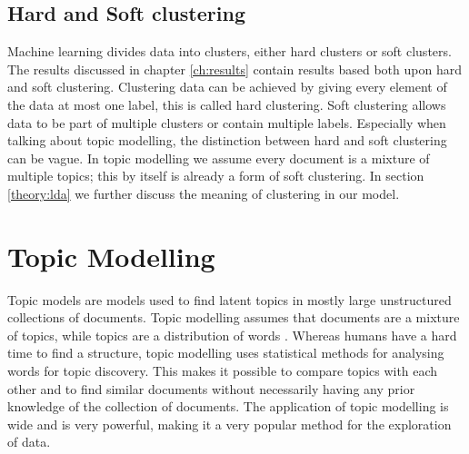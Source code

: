 \subsection{Hard and Soft clustering}
Machine learning divides data into clusters, either hard clusters or soft clusters. The results discussed in chapter \ref{ch:results} contain results based both upon hard and soft clustering. Clustering data can be achieved by giving every element of the data at most one label, this is called hard clustering. Soft clustering allows data to be part of multiple clusters or contain multiple labels. Especially when talking about topic modelling, the distinction between hard and soft clustering can be vague. In topic modelling we assume every document is a mixture of multiple topics; this by itself is already a form of soft clustering. In section \ref{theory:lda} we further discuss the meaning of clustering in our model.

\section{Topic Modelling}\label{theory:tm}
Topic models are models used to find latent topics in mostly large unstructured collections of documents. Topic modelling assumes that documents are a mixture of topics, while topics are a distribution of words \cite{Blei2010}. Whereas humans have a hard time to find a structure, topic modelling uses statistical methods for analysing words for topic discovery. This makes it possible to compare topics with each other and to find similar documents without necessarily having any prior knowledge of the collection of documents. The application of topic modelling is wide and is very powerful, making it a very popular method for the exploration of data. 


